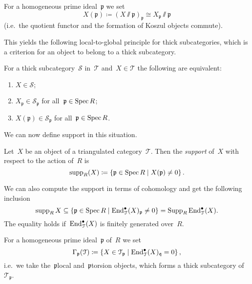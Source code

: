 \documentclass[10pt,a4paper]{article}
\begin{document}
\begin{definition}
  For a homogeneous prime ideal~$\mathfrak{p}$ we set
  \begin{equation}
    X(\mathfrak{p})\coloneqq(X\sslash\mathfrak{p})_{\mathfrak{p}}\cong X_{\mathfrak{p}}\sslash\mathfrak{p}
  \end{equation}
  (i.e.\ the quotient functor and the formation of Koszul objects commute).
\end{definition}
This yields the following local-to-global principle for thick subcategories, which is a criterion for an object to belong to a thick subcategory.
\begin{theorem}
  For a thick subcategory~$\mathcal{S}$ in~$\mathcal{T}$ and~$X\in\mathcal{T}$ the following are equivalent:
  \begin{enumerate}
    \item $X\in\mathcal{S}$;
    \item $X_{\mathfrak{p}}\in\mathcal{S}_{\mathfrak{p}}$ for all~$\mathfrak{p}\in\operatorname{Spec} R$;
    \item $X(\mathfrak{p})\in\mathcal{S}_{\mathfrak{p}}$ for all~$\mathfrak{p}\in\operatorname{Spec} R$.
  \end{enumerate}
\end{theorem}
We can now define support in this situation.
\begin{definition}
  Let~$X$ be an object of a triangulated category~$\mathcal{T}$. Then the \emph{support} of~$X$ with respect to the action of~$R$ is
  \begin{equation}
    \operatorname{supp}_R(X)\coloneqq\left\{ \mathfrak{p}\in\operatorname{Spec} R\mid X(\mathfrak{p})\neq 0 \right\}.
  \end{equation}
\end{definition}
\begin{remark}
  We can also compute the support in terms of cohomology and get the following inclusion
  \begin{equation}
    \operatorname{supp}_R X\subseteq\left\{ \mathfrak{p}\in\operatorname{Spec} R\mid\operatorname{End}_{\mathcal{T}}^\bullet(X)_{\mathfrak{p}}\neq 0 \right\}=\operatorname{Supp}_R\operatorname{End}_{\mathcal{T}}^\bullet(X).
  \end{equation}
  The equality holds if~$\operatorname{End}_{\mathcal{T}}^\bullet(X)$ is finitely generated over~$R$.
\end{remark}

For a homogeneous prime ideal~$\mathfrak{p}$ of~$R$ we set
\begin{equation}
  \Gamma_{\mathfrak{p}}(\mathcal{T})\coloneqq\left\{ X\in\mathcal{T}_{\mathfrak{p}}\mid\operatorname{End}_{\mathcal{T}}^\bullet(X)_{\mathfrak{q}}=0 \right\},
\end{equation}
i.e.\ we take the~$\mathfrak{p}$\dash local and~$\mathfrak{p}$\dash torsion objects, which forms a thick subcategory of~$\mathcal{T}_{\mathfrak{p}}$.
\end{document}
